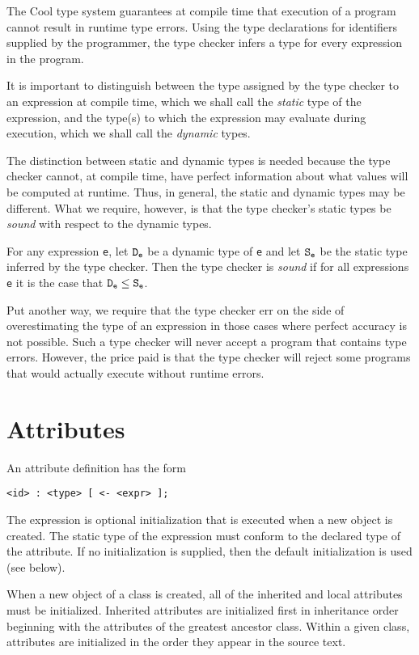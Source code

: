 The Cool type system guarantees at compile time that execution of a program
cannot result in runtime type errors.  Using the type declarations for
identifiers supplied by the programmer, the type checker infers a type for
every expression in the program.  

It is important to distinguish between the type assigned by the type
checker to an expression at compile time, which we shall call the {\em
static} type of the expression, and the type(s) to which the
expression may evaluate during execution, which we shall call the {\em
dynamic} types.

The distinction between static and dynamic types is needed because the
type checker cannot, at compile time, have perfect information about
what values will be computed at runtime.  Thus, in general, the static and
dynamic types may be different.  What we require, however, is that the
type checker's static types be {\em sound} with respect to the dynamic types.

\begin{definition}
\rm
For any expression  {\tt e}, let $\tt D_e$ be a dynamic type of {\tt e}
and let $\tt S_e$ be the static type inferred by the type checker.
Then the type checker is {\em sound} if for all expressions {\tt e} it is the
case that $\tt D_e \leq S_e$.
\end{definition}

Put another way, we require that the type checker err on the side of
overestimating the type of an expression in those cases where perfect
accuracy is not possible.  Such a type checker will never accept a
program that contains type errors.  However, the price paid is that
the type checker will reject some programs that would actually execute
without runtime errors.

\section{Attributes}
\label{sec-attr}

An attribute definition has the form
\begin{verbatim}
<id> : <type> [ <- <expr> ];
\end{verbatim}
The expression is optional initialization that is executed when a new
object is created.  The static type of the expression must conform to
the declared type of the attribute.  If no initialization is supplied,
then the default initialization is used (see below).

When a new object of a class is created, all of
the inherited and local attributes must be initialized.  Inherited
attributes are initialized first in inheritance order beginning with the
attributes of the greatest ancestor class. Within a given class,
attributes are initialized in the order they appear in the source
text.

